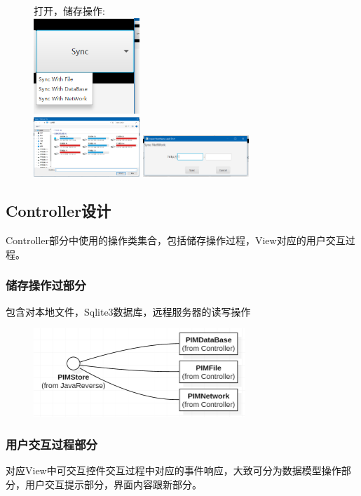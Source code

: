 \documentclass[a4paper]{article}
\begin{document}
        \begin{figure}[H]
            打开，储存操作:\\
            \centering
            \includegraphics[width=4cm]{s.png}\\
            \includegraphics[width=4cm]{s12.png}
            \includegraphics[width=4cm]{s3.png}\\
        \end{figure}
\subsection{Controller设计}
    Controller部分中使用的操作类集合，包括储存操作过程，View对应的用户交互过程。
    \subsubsection{储存操作过部分}
    包含对本地文件，Sqlite3数据库，远程服务器的读写操作
    \begin{figure}[h]
        \centering
        \includegraphics[width=8cm]{summe03.PNG}\\
    \end{figure}
    \subsubsection{用户交互过程部分}
        对应View中可交互控件交互过程中对应的事件响应，大致可分为数据模型操作部分，用户交互提示部分，界面内容跟新部分。\\
\end{document}

